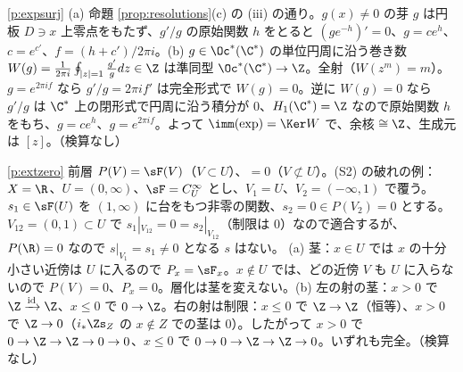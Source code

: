 \begin{sol}{\ref{p:expsurj}}
(a) 命題 \ref{prop:resolutions}(c) の (iii) の通り。$g(x)\ne0$ の芽 $g$ は円板 $D\ni x$ 上零点をもたず、$g'/g$ の原始関数 $h$ をとると $(ge^{-h})'=0$、$g=ce^h$、$c=e^{c'}$、$f=(h+c')/2\pi i$。(b) $g\in\Oc^*(\C^*)$ の単位円周に沿う巻き数 $W(g)=\frac1{2\pi i}\oint_{|z|=1}\frac{g'}gdz\in\Z$ は準同型 $\Oc^*(\C^*)\to\Z$。全射（$W(z^m)=m$）。$g=e^{2\pi if}$ なら $g'/g=2\pi if'$ は完全形式で $W(g)=0$。逆に $W(g)=0$ なら $g'/g$ は $\C^*$ 上の閉形式で円周に沿う積分が $0$、$H_1(\C^*)=\Z$ なので原始関数 $h$ をもち、$g=ce^h$、$g=e^{2\pi if}$。よって $\imm(\exp)=\Ker W$ で、余核 $\cong\Z$、生成元は $[z]$。（検算なし）
\end{sol}
\begin{sol}{\ref{p:extzero}}
前層 $P(V)=\sF(V)$（$V\subset U$）、$=0$（$V\not\subset U$）。(S2) の破れの例：$X=\R$、$U=(0,\infty)$、$\sF=C^\infty_U$ とし、$V_1=U$、$V_2=(-\infty,1)$ で覆う。$s_1\in\sF(U)$ を $(1,\infty)$ に台をもつ非零の関数、$s_2=0\in P(V_2)=0$ とする。$V_{12}=(0,1)\subset U$ で $s_1|_{V_{12}}=0=s_2|_{V_{12}}$（制限は $0$）なので適合するが、$P(\R)=0$ なので $s|_{V_1}=s_1\ne0$ となる $s$ はない。
(a) 茎：$x\in U$ では $x$ の十分小さい近傍は $U$ に入るので $P_x=\sF_x$。$x\notin U$ では、どの近傍 $V$ も $U$ に入らないので $P(V)=0$、$P_x=0$。層化は茎を変えない。(b) 左の射の茎：$x>0$ で $\Z\xrightarrow{\mathrm{id}}\Z$、$x\le0$ で $0\to\Z$。右の射は制限：$x\le0$ で $\Z\to\Z$（恒等）、$x>0$ で $\Z\to0$（$i_*\Zs_Z$ の $x\notin Z$ での茎は $0$）。したがって $x>0$ で $0\to\Z\to\Z\to0\to0$、$x\le0$ で $0\to0\to\Z\to\Z\to0$。いずれも完全。（検算なし）
\end{sol}

